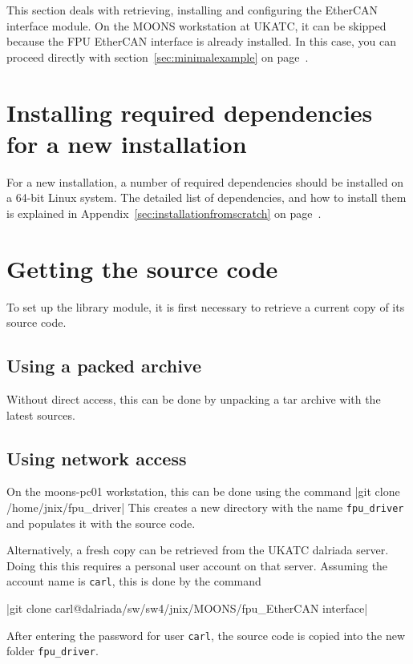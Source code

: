 \documentclass[fontsize=12,a4paper]{scrreprt}
\begin{document}
\minitoc


This section deals with retrieving, installing and configuring the
EtherCAN interface module. On the MOONS workstation at UKATC, it can
be skipped because the FPU EtherCAN interface is already installed.
In this case, you can proceed directly with
section~\ref{sec:minimalexample} on page~\pageref{sec:minimalexample}.

\section{Installing required dependencies for a new installation}
For a new installation, a number of required dependencies should be
installed on a 64-bit Linux system. The detailed list of dependencies,
and how to install them is explained in
Appendix~\ref{sec:installationfromscratch} on
page~\pageref{sec:installationfromscratch}.


\section{Getting the source code}

To set up the library module, it is first necessary to retrieve a
current copy of its source code.

\subsection{Using a packed archive}
Without direct access, this can be done by unpacking a tar archive
with the latest sources.


\subsection{Using network access}
On the moons-pc01 workstation, this can be done using the command
|git clone /home/jnix/fpu_driver| This creates a new
directory with the name \texttt{fpu\_driver} and populates it with the
source code.

Alternatively, a fresh copy can be retrieved from the UKATC dalriada
server. Doing this this requires a personal user account on that
server. Assuming the account name is \texttt{carl}, this is done by
the command

|git clone carl@dalriada/sw/sw4/jnix/MOONS/fpu_EtherCAN interface|

After entering the password for user \texttt{carl}, the
source code is copied into the new folder \texttt{fpu\_driver}.
\end{document}
